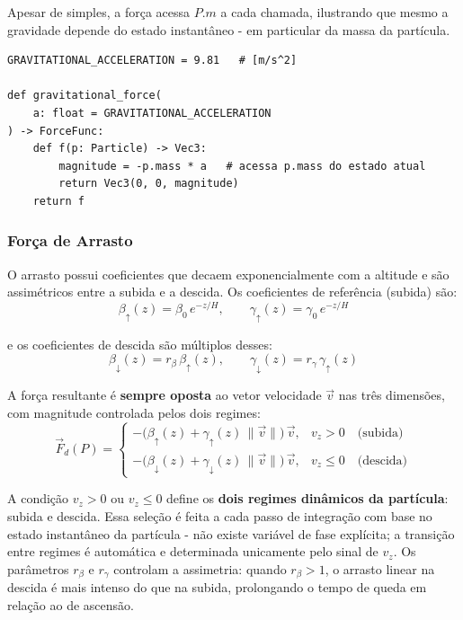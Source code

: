 Apesar de simples, a força acessa $P.m$ a cada chamada, ilustrando que mesmo a gravidade depende do estado instantâneo - em particular da massa da partícula.

\begin{lstlisting}[caption={Força gravitacional como closure}, label={lst:grav}]
GRAVITATIONAL_ACCELERATION = 9.81   # [m/s^2]

def gravitational_force(
    a: float = GRAVITATIONAL_ACCELERATION
) -> ForceFunc:
    def f(p: Particle) -> Vec3:
        magnitude = -p.mass * a   # acessa p.mass do estado atual
        return Vec3(0, 0, magnitude)
    return f
\end{lstlisting}

\subsubsection{Força de Arrasto}

O arrasto possui coeficientes que decaem exponencialmente com a altitude e são assimétricos entre a subida e a descida. Os coeficientes de referência (subida) são:
\begin{equation}
    \beta_\uparrow(z) = \beta_0\,e^{-z/H}, \qquad
    \gamma_\uparrow(z) = \gamma_0\,e^{-z/H}
\end{equation}

e os coeficientes de descida são múltiplos desses:
\begin{equation}
    \beta_\downarrow(z) = r_\beta\,\beta_\uparrow(z), \qquad
    \gamma_\downarrow(z) = r_\gamma\,\gamma_\uparrow(z)
\end{equation}

A força resultante é \textbf{sempre oposta} ao vetor velocidade $\vec{v}$ nas três dimensões, com magnitude controlada pelos dois regimes:
\begin{equation}
    \vec{F}_d(P) = \begin{cases}
        -\bigl(\beta_\uparrow(z) + \gamma_\uparrow(z)\,\|\vec{v}\|\bigr)\,\vec{v}, & v_z > 0 \quad\text{(subida)}\\[6pt]
        -\bigl(\beta_\downarrow(z) + \gamma_\downarrow(z)\,\|\vec{v}\|\bigr)\,\vec{v}, & v_z \leq 0 \quad\text{(descida)}
    \end{cases}
\end{equation}

A condição $v_z > 0$ ou $v_z \leq 0$ define os \textbf{dois regimes dinâmicos da partícula}: subida e descida. Essa seleção é feita a cada passo de integração com base no estado instantâneo da partícula - não existe variável de fase explícita; a transição entre regimes é automática e determinada unicamente pelo sinal de $v_z$. Os parâmetros $r_\beta$ e $r_\gamma$ controlam a assimetria: quando $r_\beta > 1$, o arrasto linear na descida é mais intenso do que na subida, prolongando o tempo de queda em relação ao de ascensão.

